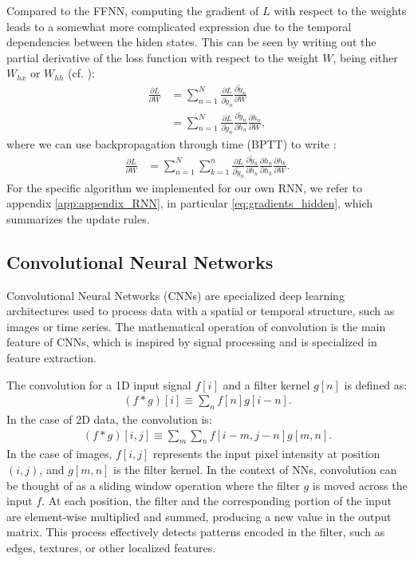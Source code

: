 \documentclass[%
reprint,
amsmath,amssymb,
aps,
]{revtex4-2}
\begin{document}
Compared to the FFNN, computing the gradient of \(L\) with respect to the weights leads to a somewhat more complicated expression due to the temporal dependencies between the hiden states. This can be seen by writing out the partial derivative of the loss function with respect to the weight \(W\),  being either \(W_{hx}\) or \(W_{hh}\) (cf. \cite{superGood}):
\begin{align}
	\frac{\partial L}{\partial W} &= \sum_{n=1}^{N}\frac{\partial L}{\partial \tilde{y}_{n}} \frac{\partial \tilde{y}_{n}}{\partial W}\\
	&= \sum_{n=1}^{N}\frac{\partial L}{\partial \tilde{y}_{n}} \frac{\partial \tilde{y}_{n}}{\partial h_{n}}\frac{\partial h_{n}}{\partial W},
\end{align}
where we can use backpropagation through time (BPTT) to write \cite{superGood}:
\begin{align}	\label{eq:dL_dW_bare}
	\frac{\partial L}{\partial W} &= \sum_{n=1}^{N}\sum_{k=1}^{n}\frac{\partial L}{\partial \tilde{y}_{n}} \frac{\partial \tilde{y}_{n}}{\partial h_{n}} \frac{\partial h_{n}}{\partial h_{k}} \frac{\partial h_{k}}{\partial W}.
\end{align}
For the specific algorithm we implemented for our own RNN, we refer to appendix \ref{app:appendix_RNN}, in particular \eqref{eq:gradients_hidden}, which summarizes the update rules.

\subsection{Convolutional Neural Networks}  
Convolutional Neural Networks (CNNs) are specialized deep learning architectures used to process data with a spatial or temporal structure, such as images or time series. The mathematical operation of convolution is the main feature of CNNs, which is inspired by signal processing and is specialized in feature extraction.

The convolution for a 1D input signal $f[i]$ and a filter kernel $g[n]$ is defined as:
\begin{align}
	(f*g)[i]\equiv\sum_{n}f[n]g[i-n].
\end{align}
In the case of 2D data, the convolution is:
\begin{align}
	(f*g)[i,j]\equiv\sum_{m}\sum_{n}f[i-m,j-n]g[m,n].
\end{align}
In the case of images, $f[i,j]$ represents the input pixel intensity at position $(i,j)$, and $g[m,n]$ is the filter kernel. In the context of NNs, convolution can be thought of as a sliding window operation where the filter $g$ is moved across the input $f$. At each position, the filter and the corresponding portion of the input are element-wise multiplied and summed, producing a new value in the output matrix. This process effectively detects patterns encoded in the filter, such as edges, textures, or other localized features.
\end{document}
